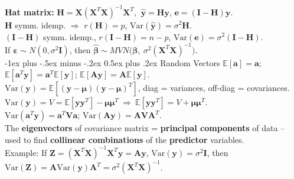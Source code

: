 \documentclass[10pt,landscape]{article}
\makeatletter
\renewcommand{\subsection}{\@startsection{subsection}{2}{0mm}%
                                {-1ex plus -.5ex minus -.2ex}%
                                {0.5ex plus .2ex}%
                                {\normalfont\small\bfseries}}
\makeatother
\begin{document}
\begin{multicols}{3}
\medskip
\textbf{Hat matrix:} $\mathbf{H} = \mathbf{X}(\mathbf{X}^T \mathbf{X})^{-1}\mathbf{X}^T$, $\ \mathbf{\widehat y} = \mathbf{H}\mathbf {y}$, $\mathbf{e} = (\mathbf{I}-\mathbf{H})\mathbf{y}$.\\
$\mathbf{H}$ symm. idemp. $\Rightarrow$ $r(\mathbf{H}) = p$, $\mathrm{Var}(\mathbf{\widehat y}) = \sigma^2 \mathbf{H}$.\\
$(\mathbf{I}-\mathbf{H})$ symm. idemp., $r(\mathbf{I}-\mathbf{H}) = n-p$, $\mathrm{Var}(\mathbf{e}) = \sigma^2(\mathbf{I}-\mathbf{H})$.\\
\medskip
If $\boldsymbol\varepsilon \sim N(0,\sigma^2 \mathbf{I})$, then $\widehat{\boldsymbol{\beta}} \sim MVN\big(\boldsymbol{\beta},\ \sigma^2 (\mathbf{X}^T \mathbf{X})^{-1}\big)$.\\
\medskip
\subsection{Random Vectors}
$\mathbb{E}[\mathbf{a}] = \mathbf{a}$; $\mathbb{E}[\mathbf{a}^T \mathbf{y}] = \mathbf{a}^T \mathbb{E}[\mathbf{y}]$; $\mathbb{E}[\mathbf{A}\mathbf{y}] = \mathbf{A}\mathbb{E}[\mathbf{y}]$.\\
\medskip
$\mathrm{Var}(\mathbf{y}) = \mathbb{E}[(\mathbf{y}-\boldsymbol\mu)(\mathbf{y}-\boldsymbol\mu)^T]$, diag = variances, off-diag = covariances.\\
$\mathrm{Var}(\mathbf{y}) = V = \mathbb{E}[\mathbf{y}\mathbf{y}^T] - \boldsymbol\mu\boldsymbol\mu^T \ \Rightarrow\ \mathbb{E}[\mathbf{y}\mathbf{y}^T] = V + \boldsymbol\mu\boldsymbol\mu^T$.\\
$\mathrm{Var}(\mathbf{a}^T \mathbf{y}) = \mathbf{a}^T \mathbf{V} \mathbf{a}$; \quad $\mathrm{Var}(\mathbf{A}\mathbf{y}) = \mathbf{A}\mathbf{V}\mathbf{A}^T$.\\
The \textbf{eigenvectors} of covariance matrix = \textbf{principal components} of data -- used to find \textbf{collinear combinations} of the \textbf{predictor} variables.\\
\medskip
Example: If $\mathbf{Z} = (\mathbf{X}^T \mathbf{X})^{-1} \mathbf{X}^T \mathbf{y} = \mathbf{A}\mathbf{y}$, $\mathrm{Var}(\mathbf{y}) = \sigma^2 \mathbf{I}$, then $\mathrm{Var}(\mathbf{Z}) = \mathbf{A}\mathrm{Var}(\mathbf{y})\mathbf{A}^T = \sigma^2 (\mathbf{X}^T \mathbf{X})^{-1}$.\\
\medskip\medskip

\end{multicols}
\end{document}

